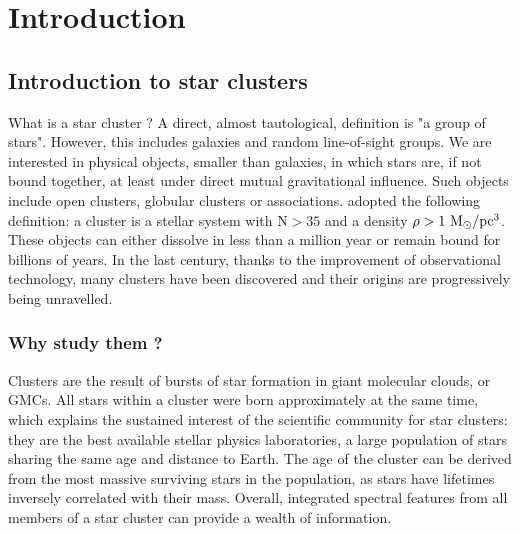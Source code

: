 

\chapter{Introduction}

\newpage

\section{Introduction to star clusters}


 What is a star cluster ? A direct, almost tautological, definition is "a group of stars". However, this includes galaxies and random line-of-sight groups. We are interested in physical objects, smaller than galaxies, in which stars are, if not bound together, at least under direct mutual gravitational influence. Such objects include open clusters, globular clusters or associations.  \cite{Lada2003} adopted the following definition: a cluster is a stellar system with N$>35$ and a density $\rho > 1~{\textrm{M}_\odot} /\textrm{pc}^3$. These objects can either dissolve in less than a million year or remain bound for billions of years. In the last century, thanks to the improvement of observational technology, many  clusters have been discovered and their origins are progressively being unravelled.


\subsection{Why study them ?}

Clusters are the result of bursts of star formation in giant molecular clouds, or GMCs. All stars within a cluster were born approximately at the same time, which explains the sustained interest of the scientific community for star clusters: they are the best available stellar physics laboratories, a large population of stars sharing the same age and distance to Earth. The age of the cluster can be derived from the most massive surviving stars in the population, as stars have lifetimes inversely correlated with their mass. Overall, integrated spectral features from all members of a star cluster can provide a wealth of information.

